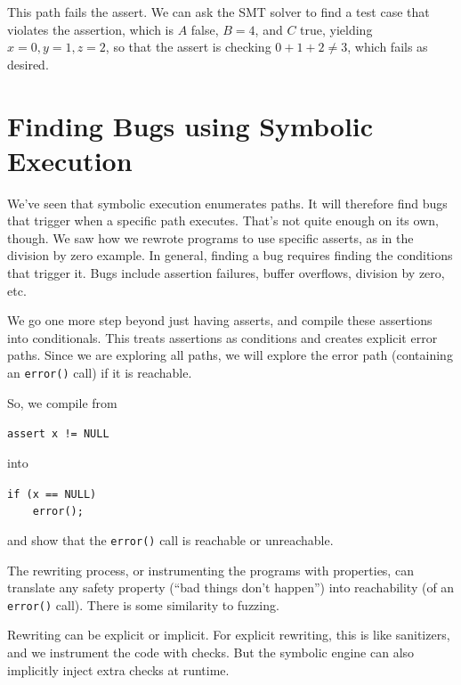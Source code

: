 \documentclass[11pt]{article}
\begin{document}
\begin{center}
\end{center}
This path fails the assert. We can ask the SMT solver to find a test case that violates the assertion, which is $A$ false, $B=4$, and $C$ true,
yielding $x = 0, y = 1, z = 2$, so that the assert is checking $0 + 1 + 2 \neq 3$, which fails as desired.

\section*{Finding Bugs using Symbolic Execution}
We've seen that symbolic execution enumerates paths. It will therefore find bugs that trigger when a specific path executes. That's not quite enough on its own, though.
We saw how we rewrote programs to use specific asserts, as in the division by zero example. In general, finding a bug requires finding the conditions that trigger it.
Bugs include assertion failures, buffer overflows, division by zero, etc.

We go one more step beyond just having asserts, and compile these assertions into conditionals. This treats assertions as conditions and creates explicit error paths. Since
we are exploring all paths, we will explore the error path (containing an \texttt{error()} call) if it is reachable.

So, we compile from
\begin{center}
  \texttt{assert x != NULL}
\end{center}
into
\begin{center}
  \texttt{if (x == NULL)}\\
  \texttt{~~~~error();}
\end{center}
and show that the \texttt{error()} call is reachable or unreachable.

The rewriting process, or instrumenting the programs with properties, can
translate any safety property (``bad things don't happen'') into
reachability (of an \texttt{error()} call). There is some similarity
to fuzzing.

Rewriting can be explicit or implicit. For explicit rewriting, this is like
sanitizers, and we instrument the code with checks. But the symbolic engine
can also implicitly inject extra checks at runtime.
\end{document}
